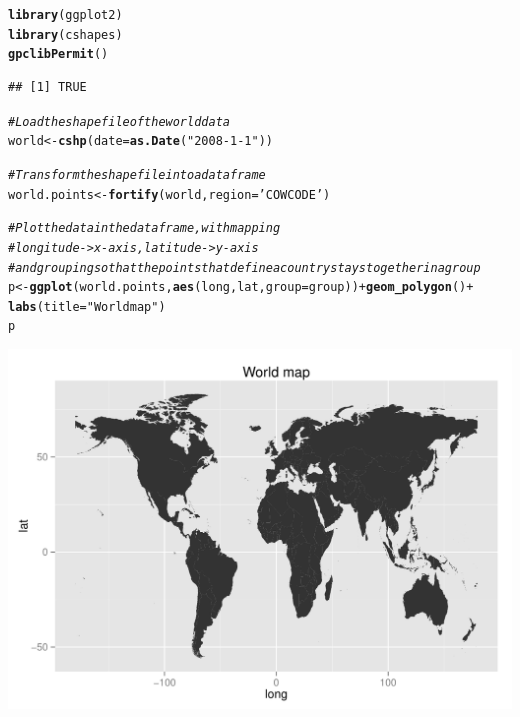 \documentclass{article}\usepackage[]{graphicx}\usepackage[]{color}
\makeatletter
\def\maxwidth{ %
  \ifdim\Gin@nat@width>\linewidth
    \linewidth
  \else
    \Gin@nat@width
  \fi
}
\newcommand{\hlstr}[1]{\textcolor[rgb]{0.192,0.494,0.8}{#1}}%
\newcommand{\hlcom}[1]{\textcolor[rgb]{0.678,0.584,0.686}{\textit{#1}}}%
\newcommand{\hlopt}[1]{\textcolor[rgb]{0,0,0}{#1}}%
\newcommand{\hlstd}[1]{\textcolor[rgb]{0.345,0.345,0.345}{#1}}%
\newcommand{\hlkwb}[1]{\textcolor[rgb]{0.69,0.353,0.396}{#1}}%
\newcommand{\hlkwc}[1]{\textcolor[rgb]{0.333,0.667,0.333}{#1}}%
\newcommand{\hlkwd}[1]{\textcolor[rgb]{0.737,0.353,0.396}{\textbf{#1}}}%
\newenvironment{kframe}{%
 \def\at@end@of@kframe{}%
 \ifinner\ifhmode%
  \def\at@end@of@kframe{\end{minipage}}%
  \begin{minipage}{\columnwidth}%
 \fi\fi%
 \def\FrameCommand##1{\hskip\@totalleftmargin \hskip-\fboxsep
 \colorbox{shadecolor}{##1}\hskip-\fboxsep
     \hskip-\linewidth \hskip-\@totalleftmargin \hskip\columnwidth}%
 \MakeFramed {\advance\hsize-\width
   \@totalleftmargin\z@ \linewidth\hsize
   \@setminipage}}%
 {\par\unskip\endMakeFramed%
 \at@end@of@kframe}
\newenvironment{knitrout}{}{} %
\makeatother
\begin{document}
\begin{knitrout}
\color{fgcolor}\begin{kframe}
\begin{alltt}
\hlkwd{library}\hlstd{(ggplot2)}
\hlkwd{library}\hlstd{(cshapes)}
\hlkwd{gpclibPermit}\hlstd{()}
\end{alltt}


{\ttfamily\noindent\color{warningcolor}{\#\# Warning in gpclibPermit(): support for gpclib will be withdrawn from maptools at the next major release}}\begin{verbatim}
## [1] TRUE
\end{verbatim}
\begin{alltt}
\hlcom{# Load the shape file of the world data}
\hlstd{world} \hlkwb{<-} \hlkwd{cshp}\hlstd{(}\hlkwc{date}\hlstd{=}\hlkwd{as.Date}\hlstd{(}\hlstr{"2008-1-1"}\hlstd{))}

\hlcom{# Transform the shape file into a data frame}
\hlstd{world.points} \hlkwb{<-} \hlkwd{fortify}\hlstd{(world,} \hlkwc{region}\hlstd{=}\hlstr{'COWCODE'}\hlstd{)}

\hlcom{# Plot the data in the data frame, with mapping}
\hlcom{# longitude -> x-axis, latitude -> y-axis}
\hlcom{# and grouping so that the points that define a country stays together in a group}
\hlstd{p} \hlkwb{<-} \hlkwd{ggplot}\hlstd{(world.points,} \hlkwd{aes}\hlstd{(long, lat,} \hlkwc{group}\hlstd{=group))} \hlopt{+} \hlkwd{geom_polygon}\hlstd{()} \hlopt{+}
  \hlkwd{labs}\hlstd{(}\hlkwc{title} \hlstd{=} \hlstr{"World map"}\hlstd{)}
\hlstd{p}
\end{alltt}
\end{kframe}
\includegraphics[width=\maxwidth]{figure/unnamed-chunk-5-1} 

\end{knitrout}
\end{document}
